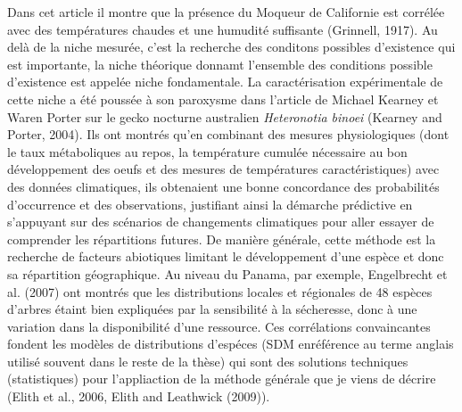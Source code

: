 Dans cet article il montre que la présence du Moqueur de Californie est
corrélée avec des températures chaudes et une humudité suffisante
(Grinnell, 1917). Au delà de la niche mesurée, c'est la recherche des
conditons possibles d'existence qui est importante, la niche théorique
donnamt l'ensemble des conditions possible d'existence est appelée niche
fondamentale. La caractérisation expérimentale de cette niche a été
poussée à son paroxysme dans l'article de Michael Kearney et Waren
Porter sur le gecko nocturne australien \emph{Heteronotia binoei}
(Kearney and Porter, 2004). Ils ont montrés qu'en combinant des mesures
physiologiques (dont le taux métaboliques au repos, la température
cumulée nécessaire au bon développement des oeufs et des mesures de
températures caractéristiques) avec des données climatiques, ils
obtenaient une bonne concordance des probabilités d'occurrence et des
observations, justifiant ainsi la démarche prédictive en s'appuyant sur
des scénarios de changements climatiques pour aller essayer de
comprender les répartitions futures. De manière générale, cette méthode
est la recherche de facteurs abiotiques limitant le développement d'une
espèce et donc sa répartition géographique. Au niveau du Panama, par
exemple, Engelbrecht et al. (2007) ont montrés que les distributions
locales et régionales de 48 espèces d'arbres étaint bien expliquées par
la sensibilité à la sécheresse, donc à une variation dans la
disponibilité d'une ressource. Ces corrélations convaincantes fondent
les modèles de distributions d'espéces (SDM enréférence au terme anglais
utilisé souvent dans le reste de la thèse) qui sont des solutions
techniques (statistiques) pour l'appliaction de la méthode générale que
je viens de décrire (Elith et al., 2006, Elith and Leathwick (2009)).

